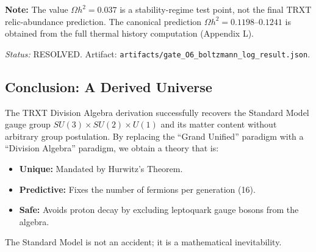 \begin{tcolorbox}[colback=purple!5!white, colframe=purple!60!black,
  title={Proof O6 — Log-Boltzmann Freeze-Out Stability (RESOLVED)}]
\textbf{Note:} The value $\Omega h^2 = 0.037$ is a stability-regime test point, not the final TRXT relic-abundance prediction. The canonical prediction $\Omega h^2 = 0.1198$--$0.1241$ is obtained from the full thermal history computation (Appendix L).

\textit{Status:} RESOLVED. Artifact: \texttt{artifacts/\allowbreak gate\_\allowbreak O6\_\allowbreak boltzmann\_\allowbreak log\_\allowbreak result.json}.
\end{tcolorbox}


\subsection{Conclusion: A Derived Universe}

The TRXT Division Algebra derivation successfully recovers the Standard Model gauge group $SU(3) \times SU(2) \times U(1)$ and its matter content without arbitrary group postulation.
By replacing the ``Grand Unified'' paradigm with a ``Division Algebra'' paradigm, we obtain a theory that is:
\begin{itemize}
    \item \textbf{Unique:} Mandated by Hurwitz's Theorem.
    \item \textbf{Predictive:} Fixes the number of fermions per generation (16).
    \item \textbf{Safe:} Avoids proton decay by excluding leptoquark gauge bosons from the algebra.
\end{itemize}
The Standard Model is not an accident; it is a mathematical inevitability.
